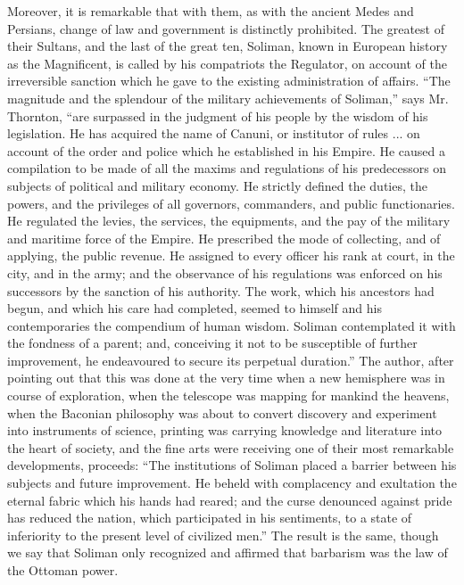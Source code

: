 Moreover, it is remarkable
that with them, as with the ancient Medes and Persians, change of law
and government is distinctly prohibited. The greatest of their
Sultans, and the last of the great ten, Soliman, known in European
history as the Magnificent, is called by his compatriots the
Regulator, on account of the irreversible sanction which he gave to
the existing administration of affairs. ``The magnitude and the
splendour of the military achievements of Soliman,'' says Mr. Thornton,
``are surpassed in the judgment of his people by the wisdom of his
legislation. He has acquired the name of Canuni, or institutor of
rules ... on account of the order and police which he established in
his Empire. He caused a compilation to be made of all the maxims and
regulations of his predecessors on subjects of political and military
economy. He strictly defined the duties, the powers, and the
privileges of all governors, commanders, and public functionaries. He
regulated the levies, the services, the equipments, and the pay of the
military and maritime force of the Empire. He prescribed the mode of
collecting, and of applying, the public revenue. He assigned to every
officer his rank at court, in the city, and in the army; and the
observance of his regulations was enforced on his successors by the
sanction of his authority. The work, which his ancestors had begun,
and which his care had completed, seemed to himself and his
contemporaries the compendium of human wisdom. Soliman contemplated it
with the fondness of a parent; and, conceiving it not to be
susceptible of further improvement, he endeavoured to secure its
perpetual duration.'' The author, after pointing out that this was done
at the very time when a new hemisphere was in course of exploration,
when the telescope was mapping for mankind the heavens, when the
Baconian philosophy was about to convert discovery and experiment into
instruments of science, printing was carrying knowledge and literature
into the heart of society, and the fine arts were receiving one of
their most remarkable developments, proceeds: ``The institutions of
Soliman placed a barrier between his subjects and future improvement.
He beheld with complacency and exultation the eternal fabric which his
hands had reared; and the curse denounced against pride has reduced
the nation, which participated in his sentiments, to a state of
inferiority to the present level of civilized men.'' The result is the
same, though we say that Soliman only recognized and affirmed that
barbarism was the law of the Ottoman power.

